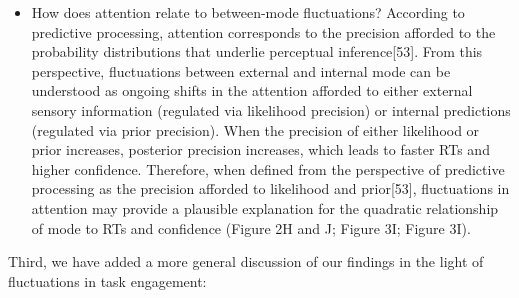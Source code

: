 \documentclass[
]{article}
\providecommand{\tightlist}{%
  \setlength{\itemsep}{0pt}\setlength{\parskip}{0pt}}
\begin{document}
\begin{itemize}
\tightlist
\item
  How does attention relate to between-mode fluctuations? According to
  predictive processing, attention corresponds to the precision afforded
  to the probability distributions that underlie perceptual
  inference{[}53{]}. From this perspective, fluctuations between
  external and internal mode can be understood as ongoing shifts in the
  attention afforded to either external sensory information (regulated
  via likelihood precision) or internal predictions (regulated via prior
  precision). When the precision of either likelihood or prior
  increases, posterior precision increases, which leads to faster RTs
  and higher confidence. Therefore, when defined from the perspective of
  predictive processing as the precision afforded to likelihood and
  prior{[}53{]}, fluctuations in attention may provide a plausible
  explanation for the quadratic relationship of mode to RTs and
  confidence (Figure 2H and J; Figure 3I; Figure 3I).
\end{itemize}

Third, we have added a more general discussion of our findings in the
light of fluctuations in task engagement:
\end{document}
